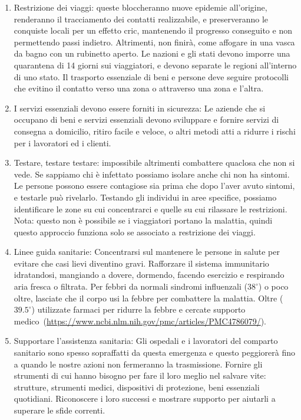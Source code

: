 \documentclass[onecolumn,journal]{IEEEtran}
\begin{document}
\begin{multicols}{2}
\begin{enumerate}
\item Restrizione dei viaggi: queste bloccheranno nuove epidemie all'origine, renderanno il tracciamento dei contatti realizzabile, e preserveranno le conquiste locali per un effetto cric, mantenendo il progresso conseguito e non permettendo passi indietro. Altrimenti, non finirà, come affogare in una vasca da bagno con un rubinetto aperto. Le nazioni e gli stati devono imporre una quarantena di 14 giorni sui viaggiatori, e devono separate le regioni all'interno di uno stato. Il trasporto essenziale di beni e persone deve seguire protocolli che evitino il contatto verso una zona o attraverso una zona e l'altra.

\item I servizi essenziali devono essere forniti in sicurezza: Le aziende che si occupano di beni e servizi essenziali devono sviluppare e fornire servizi di consegna a domicilio, ritiro facile e veloce, o altri metodi atti a ridurre i rischi per i lavoratori ed i clienti.

\item Testare, testare testare: impossibile altrimenti combattere quaclosa che non si vede. Se sappiamo chi è infettato possiamo isolare anche chi non ha sintomi. Le persone possono essere contagiose sia prima che dopo l'aver avuto sintomi, e testarle può rivelarlo. Testando gli individui in aree specifice, possiamo identificare le zone su cui concentrarci e quelle su cui rilassare le restrizioni. Nota: questo non è possibile se i viaggiatori portano la malattia, quindi questo approccio funziona solo se associato a restrizione dei viaggi.

\item Linee guida sanitarie: Concentrarsi sul mantenere le persone in salute per evitare che casi lievi diventino gravi. Rafforzare il sistema immunitario idratandosi, mangiando a dovere, dormendo, facendo esercizio e respirando aria fresca o filtrata. Per febbri da normali sindromi influenzali ($38^\circ$) o poco oltre, lasciate che il corpo usi la febbre per combattere la malattia. Oltre ($39.5^\circ$) utilizzate farmaci per ridurre la febbre e cercate supporto medico~(\url{https://www.ncbi.nlm.nih.gov/pmc/articles/PMC4786079/}).

\item Supportare l'assistenza sanitaria: Gli ospedali e i lavoratori del comparto sanitario sono spesso sopraffatti da questa emergenza e questo peggiorerà fino a quando le nostre azioni non fermeranno la trasmissione. Fornire gli strumenti di cui hanno bisogno per fare il loro meglio nel salvare vite: strutture, strumenti medici, dispositivi di protezione, beni essenziali quotidiani. Riconoscere i loro successi e mostrare supporto per aiutarli a superare le sfide correnti.

\end{enumerate}

\end{multicols}




% 
\end{document}
